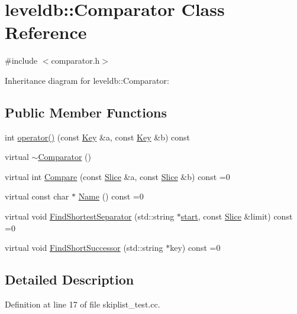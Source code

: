 \hypertarget{structleveldb_1_1_comparator}{}\section{leveldb\+:\+:Comparator Class Reference}
\label{structleveldb_1_1_comparator}


{\ttfamily \#include $<$comparator.\+h$>$}



Inheritance diagram for leveldb\+:\+:Comparator\+:
\subsection*{Public Member Functions}
\begin{DoxyCompactItemize}
\item 
int \hyperlink{structleveldb_1_1_comparator_a2c2009828869475d8375c84d65cf1c24}{operator()} (const \hyperlink{namespaceleveldb_a7e9a9725b13fa0bd922d885280dfab95}{Key} \&a, const \hyperlink{namespaceleveldb_a7e9a9725b13fa0bd922d885280dfab95}{Key} \&b) const 
\item 
virtual \hyperlink{structleveldb_1_1_comparator_a88fe2a99620c746932a8ef3ee46e8960}{$\sim$\+Comparator} ()
\item 
virtual int \hyperlink{structleveldb_1_1_comparator_a05dae6edcad3c7db23827c0233d74039}{Compare} (const \hyperlink{classleveldb_1_1_slice}{Slice} \&a, const \hyperlink{classleveldb_1_1_slice}{Slice} \&b) const =0
\item 
virtual const char $\ast$ \hyperlink{structleveldb_1_1_comparator_a888b039bdd6d59517dca75fb40721f5e}{Name} () const =0
\item 
virtual void \hyperlink{structleveldb_1_1_comparator_abdfe6076225e95b91ffd94f646063115}{Find\+Shortest\+Separator} (std\+::string $\ast$\hyperlink{db__bench_8cc_ab376b87f96a574a793c03c53e75afec8}{start}, const \hyperlink{classleveldb_1_1_slice}{Slice} \&limit) const =0
\item 
virtual void \hyperlink{structleveldb_1_1_comparator_a49751dd906595633161dfad943d24b3b}{Find\+Short\+Successor} (std\+::string $\ast$key) const =0
\end{DoxyCompactItemize}


\subsection{Detailed Description}


Definition at line 17 of file skiplist\+\_\+test.\+cc.



